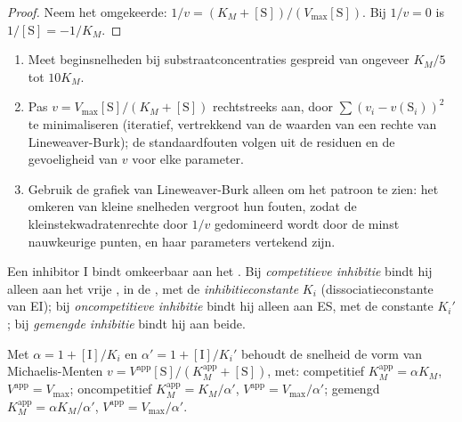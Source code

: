 \begin{proof}
Neem het omgekeerde: $1/v = (K_M + [\mathrm S])/(V_{\max}[\mathrm S])$. Bij $1/v = 0$ is $1/[\mathrm S] = -1/K_M$.
\end{proof}

\begin{method}\label{met:b3:complex-kinetics:mm-fit}
\begin{enumerate}
  \item Meet beginsnelheden bij substraatconcentraties gespreid van
        ongeveer
        $K_M/5$ tot $10K_M$.
  \item Pas $v = V_{\max}[\mathrm S]/(K_M + [\mathrm S])$ rechtstreeks aan, door $\sum(v_i - v(\mathrm S_i))^2$ te minimaliseren (iteratief,
        vertrekkend van de waarden van een rechte van Lineweaver-Burk); de
        standaardfouten volgen uit de residuen en de gevoeligheid van $v$
        voor elke parameter.
  \item Gebruik de grafiek van Lineweaver-Burk alleen om het patroon te
        zien: het omkeren van kleine snelheden vergroot hun fouten, zodat
        de kleinstekwadratenrechte door $1/v$ gedomineerd wordt door de
        minst nauwkeurige punten, en haar parameters vertekend zijn.
\end{enumerate}
\end{method}

\begin{definition}[Inhibitie]\label{def:b3:complex-kinetics:inhibition}
Een inhibitor I bindt omkeerbaar aan het . Bij \emph{competitieve
inhibitie} bindt hij alleen aan het vrije
, in de , met de
\emph{inhibitieconstante} $K_i$
(dissociatieconstante van EI); bij
\emph{oncompetitieve inhibitie}
bindt hij alleen aan ES, met de constante $K_i'$; bij \emph{gemengde
inhibitie} bindt hij aan beide.
\end{definition}

\begin{proposition}\label{prop:b3:complex-kinetics:inhibition-laws}
Met $\alpha = 1 + [\mathrm I]/K_i$ en $\alpha' = 1 + [\mathrm I]/K_i'$ behoudt de snelheid de
vorm van Michaelis-Menten $v = V^{\mathrm{app}}[\mathrm S]/(K_M^{\mathrm{app}} + [\mathrm S])$, met: competitief
$K_M^{\mathrm{app}} = \alpha K_M$, $V^{\mathrm{app}} = V_{\max}$; oncompetitief $K_M^{\mathrm{app}} = K_M/\alpha'$, $V^{\mathrm{app}} =
V_{\max}/\alpha'$; gemengd $K_M^{\mathrm{app}} = \alpha K_M/\alpha'$, $V^{\mathrm{app}} = V_{\max}/\alpha'$.
\end{proposition}

